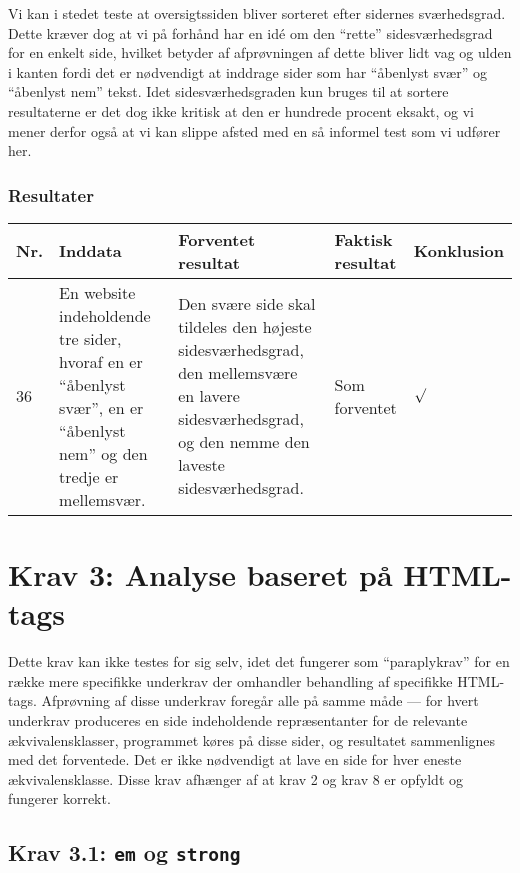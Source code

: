 \documentclass[a4paper,oneside,article]{memoir}
\begin{document}
\begin{landscape}
Vi kan i stedet teste at oversigtssiden bliver sorteret efter sidernes
sværhedsgrad. Dette kræver dog at vi på forhånd har en idé om den
``rette'' sidesværhedsgrad for en enkelt side, hvilket betyder af
afprøvningen af dette bliver lidt vag og ulden i kanten fordi det er
nødvendigt at inddrage sider som har ``åbenlyst svær'' og ``åbenlyst
nem'' tekst. Idet sidesværhedsgraden kun bruges til at sortere
resultaterne er det dog ikke kritisk at den er hundrede procent
eksakt, og vi mener derfor også at vi kan slippe afsted med en så
informel test som vi udfører her.

\subsubsection{Resultater}
\begin{longtable}[c]{p{20pt}|p{220pt}|p{130pt}|p{130pt}|p{50pt}}
\textbf{Nr.} &
\textbf{Inddata} &
\textbf{Forventet resultat} &
\textbf{Faktisk resultat} &
\textbf{Konklusion} \\ \hline

36 &
En website indeholdende tre sider, hvoraf en er ``åbenlyst svær'', en
er ``åbenlyst nem'' og den tredje er mellemsvær. &
Den svære side skal tildeles den højeste sidesværhedsgrad, den
mellemsvære en lavere sidesværhedsgrad, og den nemme den laveste
sidesværhedsgrad. &
Som forventet &
$\surd$ \\ \hline

\end{longtable}

\section{Krav 3: Analyse baseret på HTML-tags}

Dette krav kan ikke testes for sig selv, idet det fungerer som
``paraplykrav'' for en række mere specifikke underkrav der omhandler
behandling af specifikke HTML-tags. Afprøvning af disse underkrav
foregår alle på samme måde --- for hvert underkrav produceres en side
indeholdende repræsentanter for de relevante ækvivalensklasser,
programmet køres på disse sider, og resultatet sammenlignes med det
forventede. Det er ikke nødvendigt at lave en side for hver eneste
ækvivalensklasse. Disse krav afhænger af at krav 2 og krav 8 er
opfyldt og fungerer korrekt.

\subsection{Krav 3.1: \texttt{em} og \texttt{strong}}


\end{landscape}
\end{document}
